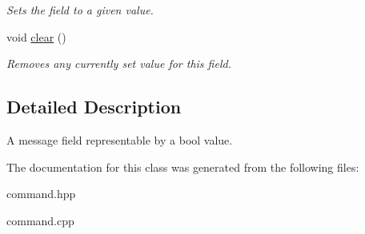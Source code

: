 \begin{DoxyCompactItemize}
\begin{DoxyCompactList}\small\item\em Sets the field to a given value. \end{DoxyCompactList}\item 
void \hyperlink{classhebi_1_1Command_1_1BoolField_ae716d99d8f178bbca09867b46207b484}{clear} ()\hypertarget{classhebi_1_1Command_1_1BoolField_ae716d99d8f178bbca09867b46207b484}{}\label{classhebi_1_1Command_1_1BoolField_ae716d99d8f178bbca09867b46207b484}

\begin{DoxyCompactList}\small\item\em Removes any currently set value for this field. \end{DoxyCompactList}\end{DoxyCompactItemize}


\subsection{Detailed Description}
A message field representable by a bool value. 

The documentation for this class was generated from the following files\+:\begin{DoxyCompactItemize}
\item 
command.\+hpp\item 
command.\+cpp\end{DoxyCompactItemize}
